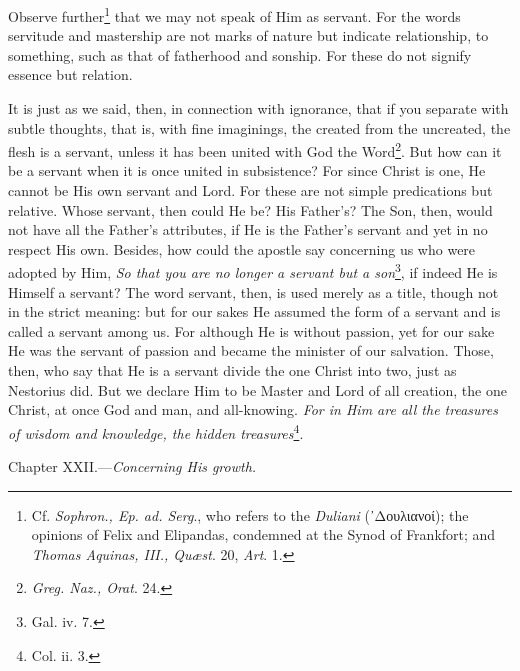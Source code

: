 Observe further\footnote{Cf. \emph{Sophron., Ep. ad. Serg}., who refers to the \emph{Duliani} (\textgreek{᾽Δουλιανοί}); the opinions of Felix and Elipandas, condemned at the Synod of Frankfort; and \emph{Thomas Aquinas, III., Quæst}. 20, \emph{Art}. 1.} that we may not speak of Him as servant. For the words servitude and mastership are not marks of nature but indicate relationship, to something, such as that of fatherhood and sonship. For these do not signify essence but relation.

It is just as we said, then, in connection with ignorance, that if you separate with subtle thoughts, that is, with fine imaginings, the created from the uncreated, the flesh is a servant, unless it has been united with God the Word\footnote{\emph{Greg. Naz., Orat}. 24.}. But how can it be a servant when it is once united in subsistence? For since Christ is one, He cannot be His own servant and Lord. For these are not simple predications but relative. Whose servant, then could He be? His Father’s? The Son, then, would not have all the Father’s attributes, if He is the Father’s servant and yet in no respect His own. Besides, how could the apostle say concerning us who were adopted by Him, \emph{So that you are no longer a servant but a son}\footnote{Gal. iv. 7.}, if indeed He is Himself a servant? The word servant, then, is used merely as a title, though not in the strict meaning: but for our sakes He assumed the form of a servant and is called a servant among us. For although He is without passion, yet for our sake He was the servant of passion and became the minister of our salvation. Those, then, who say that He is a servant divide the one Christ into two, just as Nestorius did. But we declare Him to be Master and Lord of all creation, the one Christ, at once God and man, and all-knowing. \emph{For in Him are all the treasures of wisdom and knowledge, the hidden treasures}\footnote{Col. ii. 3.}.


Chapter XXII.—\emph{Concerning His growth.}

